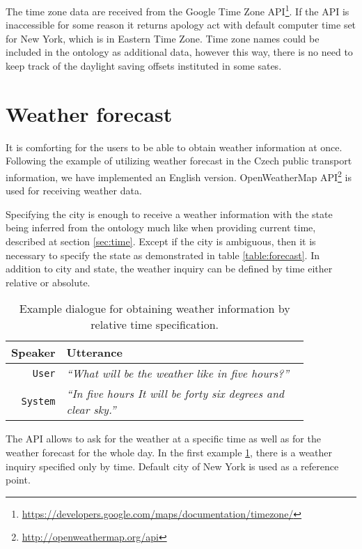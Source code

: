 The time zone data are received from the Google Time Zone API\footnote{\url{https://developers.google.com/maps/documentation/timezone/}}.
If the API is inaccessible for some reason it returns apology act with default computer time set for New York, which is in Eastern Time Zone.
Time zone names could be included in the ontology as additional data, however this way, there is no need to keep track of the daylight saving offsets instituted in some sates.

\section{Weather forecast}

It is comforting for the users to be able to obtain weather information at once.
Following the example of utilizing weather forecast in the Czech public transport information, we have implemented an English version.
OpenWeatherMap API\footnote{\url{http://openweathermap.org/api}} is used for receiving weather data.

Specifying the city is enough to receive a weather information with the state being inferred from the ontology much like when providing current time, described at section \ref{sec:time}.
Except if the city is ambiguous, then it is necessary to specify the state as demonstrated in table \ref{table:forecast}.
In addition to city and state, the weather inquiry can be defined by time either relative or absolute.

\begin{table}[h]
\centering
\begin{tabular}{ | r | p{0.85\linewidth} | } \hline
	\textbf{Speaker} & \textbf{Utterance} \\ \hline
	\texttt{User} & \textit{``What will be the weather like in five hours?''} \\ \hline
	\texttt{System} & \textit{``In five hours It will be forty six degrees and clear sky.''} \\ \hline
\end{tabular}
\caption[Weather inquiry by relative time]{Example dialogue for obtaining weather information by relative time specification.}
\label{table:weather}
\end{table}

The API allows to ask for the weather at a specific time as well as for the weather forecast for the whole day.
In the first example \ref{table:weather}, there is a weather inquiry specified only by time.
Default city of New York is used as a reference point.

